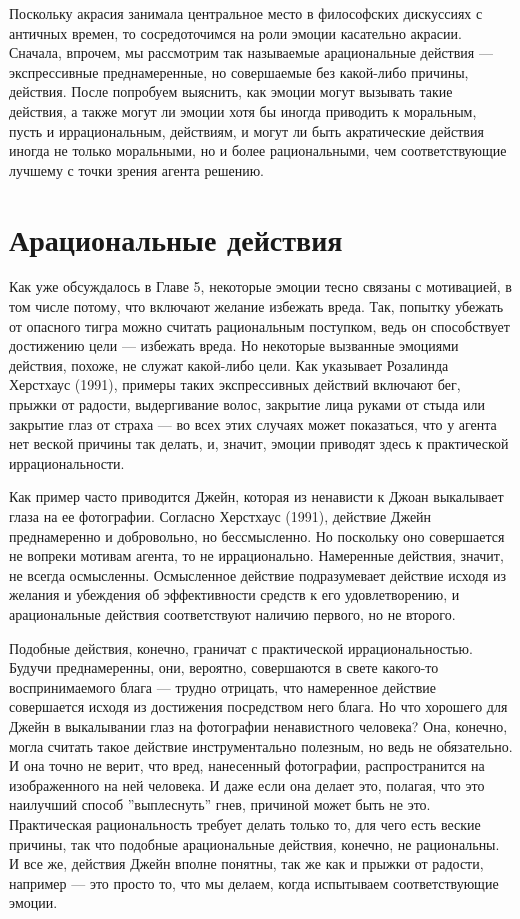 \documentclass[11pt]{book}
\begin{document}
Поскольку акрасия занимала центральное место в философских дискуссиях с античных времен, то сосредоточимся на роли эмоции касательно акрасии. Сначала, впрочем, мы рассмотрим так называемые арациональные действия --- экспрессивные преднамеренные, но совершаемые без какой-либо причины, действия. После попробуем выяснить, как эмоции могут вызывать такие действия, а также могут ли эмоции хотя бы иногда приводить к моральным, пусть и иррациональным, действиям, и могут ли быть акратические действия иногда не только моральными, но и более рациональными, чем соответствующие лучшему с точки зрения агента решению.

\section{Арациональные действия}

Как уже обсуждалось в Главе 5, некоторые эмоции тесно связаны с мотивацией, в том числе потому, что включают желание избежать вреда. Так, попытку убежать от опасного тигра можно считать рациональным поступком, ведь он способствует достижению цели --- избежать вреда. Но некоторые вызванные эмоциями действия, похоже, не служат какой-либо цели. Как указывает Розалинда Херстхаус (1991), примеры таких экспрессивных действий включают бег, прыжки от радости, выдергивание волос, закрытие лица руками от стыда или закрытие глаз от страха --- во всех этих случаях может показаться, что у агента нет веской причины так делать, и, значит, эмоции приводят здесь к практической иррациональности.

Как пример часто приводится Джейн, которая из ненависти к Джоан выкалывает глаза на ее фотографии. Согласно Херстхаус (1991), действие Джейн преднамеренно и добровольно, но бессмысленно. Но поскольку оно совершается не вопреки мотивам агента, то не иррационально. Намеренные действия, значит, не всегда осмысленны. Осмысленное действие подразумевает действие исходя из желания и убеждения об эффективности средств к его удовлетворению, и арациональные действия соответствуют наличию первого, но не второго.

Подобные действия, конечно, граничат с практической иррациональностью. Будучи преднамеренны, они, вероятно, совершаются в свете какого-то воспринимаемого блага --- трудно отрицать, что намеренное действие совершается исходя из достижения посредством него блага. Но что хорошего для Джейн в выкалывании глаз на фотографии ненавистного человека? Она, конечно, могла считать такое действие инструментально полезным, но ведь не обязательно. И она точно не верит, что вред, нанесенный фотографии, распространится на изображенного на ней человека. И даже если она делает это, полагая, что это наилучший способ ''выплеснуть'' гнев, причиной может быть не это. Практическая рациональность требует делать только то, для чего есть веские причины, так что подобные арациональные действия, конечно, не рациональны. И все же, действия Джейн вполне понятны, так же как и прыжки от радости, например --- это просто то, что мы делаем, когда испытываем соответствующие эмоции.
\end{document}
